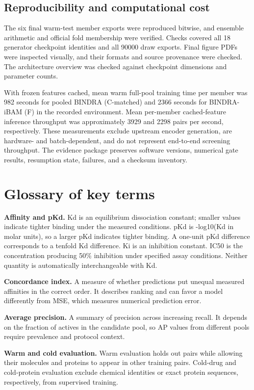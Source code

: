 \documentclass[12pt,a4paper]{article}
\begin{document}
\subsection*{Reproducibility and computational cost}
The six final warm-test member exports were reproduced bitwise, and ensemble arithmetic and official fold membership were verified. Checks covered all 18 generator checkpoint identities and all 90000 draw exports. Final figure PDFs were inspected visually, and their formats and source provenance were checked. The architecture overview was checked against checkpoint dimensions and parameter counts.

With frozen features cached, mean warm full-pool training time per member was 982 seconds for pooled BINDRA (C-matched) and 2366 seconds for BINDRA-iBAM (F) in the recorded environment. Mean per-member cached-feature inference throughput was approximately 3929 and 2298 pairs per second, respectively. These measurements exclude upstream encoder generation, are hardware- and batch-dependent, and do not represent end-to-end screening throughput. The evidence package preserves software versions, numerical gate results, resumption state, failures, and a checksum inventory.

\section*{Glossary of key terms}
\textbf{Affinity and pKd.} Kd is an equilibrium dissociation constant; smaller values indicate tighter binding under the measured conditions. pKd is -log10(Kd in molar units), so a larger pKd indicates tighter binding. A one-unit pKd difference corresponds to a tenfold Kd difference. Ki is an inhibition constant. IC50 is the concentration producing 50\% inhibition under specified assay conditions. Neither quantity is automatically interchangeable with Kd.

\textbf{Concordance index.} A measure of whether predictions put unequal measured affinities in the correct order. It describes ranking and can favor a model differently from MSE, which measures numerical prediction error.

\textbf{Average precision.} A summary of precision across increasing recall. It depends on the fraction of actives in the candidate pool, so AP values from different pools require prevalence and protocol context.

\textbf{Warm and cold evaluation.} Warm evaluation holds out pairs while allowing their molecules and proteins to appear in other training pairs. Cold-drug and cold-protein evaluation exclude chemical identities or exact protein sequences, respectively, from supervised training.
\end{document}
